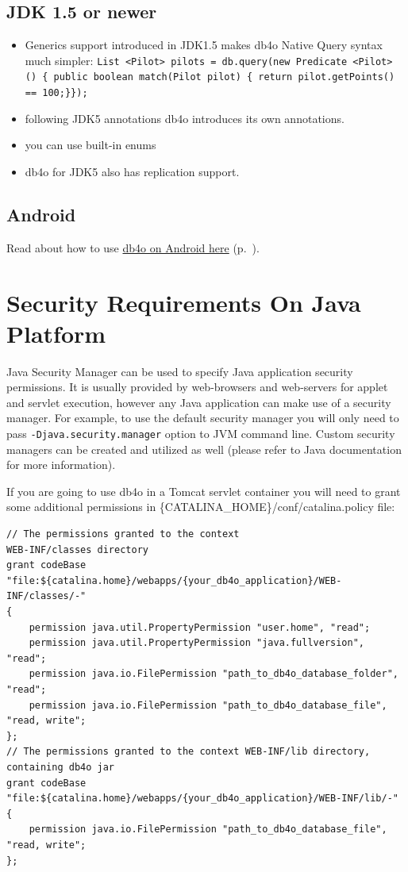\subsection*{JDK 1.5 or newer}

\begin{itemize}
\item Generics support introduced in JDK1.5 makes db4o Native Query syntax much simpler: \texttt{List \textless{}Pilot\textgreater{} pilots = db.query(new Predicate \textless{}Pilot\textgreater{} () \{ public boolean match(Pilot pilot) \{ return pilot.getPoints() == 100;\}\});}
\item following JDK5 annotations db4o introduces its own annotations.
\item you can use built-in enums
\item db4o for JDK5 also has replication support.
\end{itemize}

\subsection*{Android}

Read about how to use \hyperref[ref:platform-specific-issues-android]{db4o on Android here} (p.~\pageref{ref:platform-specific-issues-android}).

\section{Security Requirements On Java Platform}
\label{ref:platform-specific-issues-security-requirements-on-java-platform}

Java Security Manager can be used to specify Java application security permissions. It is usually provided by web-browsers and web-servers for applet and servlet execution, however any Java application can make use of a security manager. For example, to use the default security manager you will only need to pass \texttt{-Djava.security.manager} option to JVM command line. Custom security managers can be created and utilized as well (please refer to Java documentation for more information).

If you are going to use db4o in a Tomcat servlet container you will need to grant some additional permissions in \{CATALINA\_HOME\}/conf/catalina.policy file:

\begin{lstlisting}
// The permissions granted to the context 
WEB-INF/classes directory 
grant codeBase "file:${catalina.home}/webapps/{your_db4o_application}/WEB-INF/classes/-" 
{ 
    permission java.util.PropertyPermission "user.home", "read"; 
    permission java.util.PropertyPermission "java.fullversion", "read";    
    permission java.io.FilePermission "path_to_db4o_database_folder", "read";    
    permission java.io.FilePermission "path_to_db4o_database_file", "read, write"; 
}; 
// The permissions granted to the context WEB-INF/lib directory, containing db4o jar 
grant codeBase "file:${catalina.home}/webapps/{your_db4o_application}/WEB-INF/lib/-" 
{    
    permission java.io.FilePermission "path_to_db4o_database_file", "read, write"; 
};
            
\end{lstlisting}

